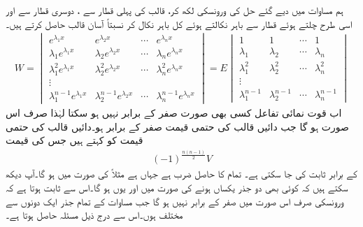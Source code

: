 ہم مساوات  میں دیے گئے حل کی ورونسکی لکھ کر، قالب کی پہلی قطار سے ، دوسری قطار سے  اور اسی طرح چلتے ہوئے  قطار سے   باہر نکالتے ہوئے کل  باہر  نکال کر نسبتاً آسان قالب حاصل کرتے ہیں۔
\begin{align}\label{مساوات_سادہ_بلند_ورونسکی_قالب_لمبی_الف}
W=
\begin{vmatrix}
e^{\lambda_1 x} & e^{\lambda_2 x} & \cdots & e^{\lambda_n x}\\
\lambda_1e^{\lambda_1 x} & \lambda_2e^{\lambda_2 x} & \cdots & \lambda_ne^{\lambda_n x}\\
\lambda_1^2 e^{\lambda_1 x} & \lambda_2^2 e^{\lambda_2 x} & \cdots & \lambda_n^2 e^{\lambda_n x}\\
\vdots & & \\ 
\lambda_1^{n-1}e^{\lambda_1 x} & \lambda_2^{n-1}e^{\lambda_2 x} & \cdots & \lambda_n^{n-1} e^{\lambda_n x}
\end{vmatrix}
=E
\begin{vmatrix}
1& 1 & \cdots & 1\\
\lambda_1& \lambda_2 & \cdots & \lambda_n\\
\lambda_1^2& \lambda_2^2 & \cdots & \lambda_n^2\\
\vdots & & \\ 
\lambda_1^{n-1} & \lambda_2^{n-1} & \cdots & \lambda_n^{n-1} 
\end{vmatrix}
\end{align}
اب قوت نمائی تفاعل  کسی بھی صورت صفر کے برابر نہیں ہو سکتا لہٰذا  صرف اس صورت ہو گا جب دائیں قالب کی حتمی قیمت صفر کے برابر ہو۔دائیں قالب کی حتمی قیمت کو  کہتے ہیں جس کی قیمت
\begin{align}\label{مساوات_سادہ_بلند_ورونسکی_قالب_لمبی_ب}
(-1)^{\frac{n(n-1)}{2}}V
\end{align}
کے برابر ثابت کی جا سکتی ہے۔  تمام  کا حاصل ضرب ہے جہاں  ہے مثلاً  کی صورت میں  ہو گا۔آپ دیکھ سکتے ہیں کہ کوئی بھی دو جذر یکساں ہونے کی صورت میں  اور یوں  ہو گا۔اس سے ثابت ہوتا ہے کہ ورونسکی صرف اس صورت میں صفر کے برابر نہیں ہو گا جب مساوات  کے تمام جذر ایک دونوں سے مختلف ہوں۔اس سے  درج ذیل مسئلہ حاصل ہوتا ہے۔

